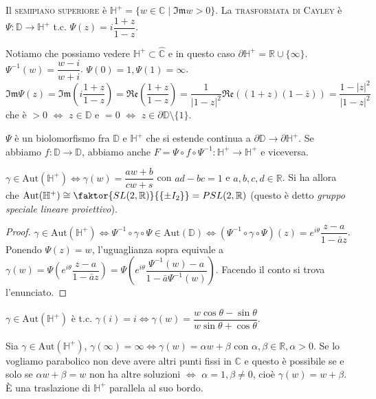 \begin{defn}
  Il \textsc{semipiano superiore} è $\mathbb{H}^+=\{w \in \mathbb{C} \mid \mathfrak{Im}w>0\}$. La \textsc{trasformata di Cayley} è $\Psi:\mathbb{D} \rightarrow \mathbb{H}^+$ t.c. $\Psi(z)=i\dfrac{1+z}{1-z}$.
\end{defn}

Notiamo che possiamo vedere $\mathbb{H}^+ \subset \hat{\mathbb{C}}$ e in questo caso $\partial\mathbb{H}^+=\mathbb{R}\cup\{\infty\}$. $\Psi^{-1}(w)=\dfrac{w-i}{w+i}$. $\Psi(0)=1, \Psi(1)=\infty$. \\
$\mathfrak{Im}\Psi(z)=\mathfrak{Im}\left(i\dfrac{1+z}{1-z}\right)=\mathfrak{Re}\left(\dfrac{1+z}{1-z}\right)=\dfrac{1}{|1-z|^2}\mathfrak{Re}((1+z)(1-\bar{z}))=\dfrac{1-|z|^2}{|1-z|^2}$ che è $>0$ $\iff$ $z \in \mathbb{D}$ e $=0$ $\iff$ $z \in \partial\mathbb{D}\setminus\{1\}$.

$\Psi$ è un biolomorfismo fra $\mathbb{D}$ e $\mathbb{H}^+$ che si estende continua a $\partial\mathbb{D} \rightarrow \partial\mathbb{H}^+$. Se abbiamo $f: \mathbb{D} \rightarrow \mathbb{D}$, abbiamo anche $F=\Psi \circ f \circ \Psi^{-1}:\mathbb{H}^+ \rightarrow \mathbb{H}^+$ e viceversa.

\begin{cor}
  $\gamma \in \text{Aut}(\mathbb{H}^+) \iff \gamma(w)=\dfrac{aw+b}{cw+s}$ con $ad-bc=1$ e $a, b, c, d \in \mathbb{R}$. Si ha allora che $\text{Aut}(\mathbb{H}^+) \cong \faktor{SL(2, \mathbb{R})}{\{\pm I_2\}}=PSL(2, \mathbb{R})$ (questo è detto \textit{gruppo speciale lineare proiettivo}).
\end{cor}

\begin{proof}
  $\gamma \in \text{Aut}(\mathbb{H}^+) \iff \Psi^{-1} \circ \gamma \circ \Psi \in \text{Aut}(\mathbb{D}) \iff (\Psi^{-1} \circ \gamma \circ \Psi)(z)=e^{i\theta}\dfrac{z-a}{1-\bar{a}z}$.
  Ponendo $\Psi(z)=w$, l'uguaglianza sopra equivale a $\gamma(w)=\Psi\left(e^{i\theta}\dfrac{z-a}{1-\bar{a}z}\right)=\Psi\left(e^{i\theta}\dfrac{\Psi^{-1}(w)-a}{1-\bar{a}\Psi^{-1}(w)}\right)$. Facendo il conto si trova l'enunciato.
\end{proof}

\begin{exc}
  $\gamma \in \text{Aut}(\mathbb{H}^+)$ è t.c. $\gamma(i)=i \iff \gamma(w)=\dfrac{w\cos{\theta}-\sin{\theta}}{w\sin{\theta}+\cos{\theta}}$.
\end{exc}

\begin{ex}
  Sia $\gamma \in \text{Aut}(\mathbb{H}^+)$, $\gamma(\infty)=\infty \iff \gamma(w)=\alpha w+\beta$ con $\alpha, \beta \in \mathbb{R}, \alpha>0$.
  Se lo vogliamo parabolico non deve avere altri punti fissi in $\mathbb{C}$ e questo è possibile se e solo se $\alpha w+\beta=w$ non ha altre soluzioni $\iff$ $\alpha=1, \beta \not=0$, cioè $\gamma(w)=w+\beta$.
  È una traslazione di $\mathbb{H}^+$ parallela al suo bordo.
\end{ex}

